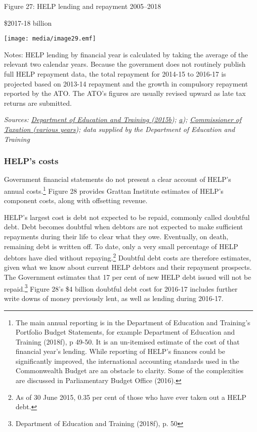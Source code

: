 \documentclass[]{book}
\begin{document}
\protect\hypertarget{_Ref452806660}{}{}Figure 27: HELP lending and repayment 2005--2018

\$2017-18 billion

\texttt{[image: media/image29.emf]}

Notes: HELP lending by financial year is calculated by taking the average of the relevant two calendar years. Because the government does not routinely publish full HELP repayment data, the total repayment for 2014-15 to 2016-17 is projected based on 2013-14 repayment and the growth in compulsory repayment reported by the ATO. The ATO's figures are usually revised upward as late tax returns are submitted.

\emph{Sources: \protect\hyperlink{_ENREF_62}{Department of Education and Training (2015b}); \protect\hyperlink{_ENREF_61}{a}); \protect\hyperlink{_ENREF_48}{Commissioner of Taxation (various years}); data supplied by the Department of Education and Training}

\hypertarget{helps-costs}{%
\subsubsection{HELP's costs}\label{helps-costs}}

Government financial statements do not present a clear account of HELP's annual costs.\footnote{The main annual reporting is in the Department of Education and Training's Portfolio Budget Statements, for example Department of Education and Training (2018f), p 49-50. It is an un-itemised estimate of the cost of that financial year's lending. While reporting of HELP's finances could be significantly improved, the international accounting standards used in the Commonwealth Budget are an obstacle to clarity. Some of the complexities are discussed in Parliamentary Budget Office (2016).} Figure 28 provides Grattan Institute estimates of HELP's component costs, along with offsetting revenue.

HELP's largest cost is debt not expected to be repaid, commonly called doubtful debt. Debt becomes doubtful when debtors are not expected to make sufficient repayments during their life to clear what they owe. Eventually, on death, remaining debt is written off. To date, only a very small percentage of HELP debtors have died without repaying.\footnote{As of 30 June 2015, 0.35 per cent of those who have ever taken out a HELP debt.} Doubtful debt costs are therefore estimates, given what we know about current HELP debtors and their repayment prospects. The Government estimates that 17 per cent of new HELP debt issued will not be repaid.\footnote{Department of Education and Training (2018f), p. 50} Figure 28's \$4 billion doubtful debt cost for 2016-17 includes further write downs of money previously lent, as well as lending during 2016-17.
\end{document}
